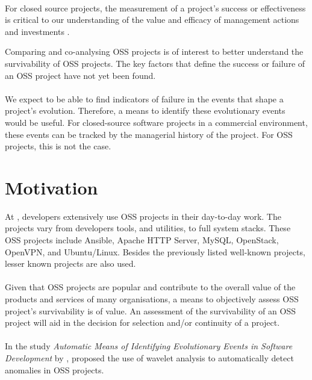 \paragraph{}
For closed source projects, the measurement of a project's success or
effectiveness is critical to our understanding of the value and efficacy of
management actions and investments \cite{delone2003}.

Comparing and co-analysing OSS projects is of interest to better understand the
survivability of OSS projects. The key factors that define the success or
failure of an OSS project have not yet been found.

\paragraph{}
We expect to be able to find indicators of failure in the events that
shape a project's evolution. Therefore, a means to identify these evolutionary
events would be useful. For closed-source software projects in a commercial
environment, these events can be tracked by the managerial history of the
project. For OSS projects, this is not the case.



\section{Motivation}
At \hostOrg, developers extensively use OSS projects in their day-to-day
work. The projects vary from developers tools, and utilities, to full system
stacks. These OSS projects include Ansible, Apache HTTP Server, MySQL,
OpenStack, OpenVPN, and Ubuntu/Linux. Besides the previously listed well-known
projects, lesser known projects are also used.

\paragraph{}
Given that OSS projects are popular and contribute to the overall value of the
products and services of many organisations, a means to objectively assess OSS
project's survivability is of value. An assessment of the survivability of an
OSS project will aid in the decision for selection and/or continuity of a
project.

\paragraph{}
In the study \emph{Automatic Means of Identifying Evolutionary Events in
Software Development }\rm by \citet{karus2013}, \citeauthor{karus2013} proposed
the use of wavelet analysis to automatically detect anomalies in OSS projects.

